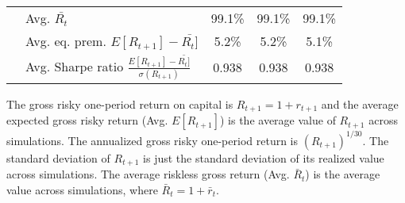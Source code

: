 \documentclass[letterpaper,12pt]{article}
\theoremstyle{definition}
\begin{document}
\begin{spacing}{1.5}
\begin{table}[htbp]
\begin{threeparttable}
\begin{tabular}{>{\small}l| >{\small}l| >{\small}c| >{\small}c| >{\small}c}
      & \quad Avg. $\bar{R_t}$ & 99.1\% & 99.1\% & 99.1\% \\
      & \quad Avg. eq. prem. $E[R_{t+1}] - \bar{R_t]}$ & 5.2\% & 5.2\% & 5.1\% \\
      & \quad Avg. Sharpe ratio $\frac{E[R_{t+1}] - \bar{R_t]}}{\sigma(R_{t+1})}$ & 0.938 & 0.938 & 0.938 \\
      \hline\hline
    \end{tabular}
    \begin{tablenotes}
      \scriptsize{\item[]The gross risky one-period return on capital is $R_{t+1} = 1 + r_{t+1}$ and the average expected gross risky return (Avg. $E[R_{t+1}]$) is the average value of $R_{t+1}$ across simulations. The annualized gross risky one-period return is $(R_{t+1})^{1/30}$. The standard deviation of $R_{t+1}$ is just the standard deviation of its realized value across simulations. The average riskless gross return (Avg. $\bar{R}_t$) is the average value across simulations, where $\bar{R}_t=1+\bar{r}_t$.}
    \end{tablenotes}
    \end{threeparttable}
  \end{table}


\end{spacing}
\end{document}
